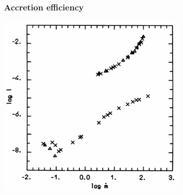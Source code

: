 \documentclass{beamer}
\begin{document}
\begin{frame}
    \frametitle{Accretion efficiency}
    \centering
    \includegraphics[width=0.7\textwidth]{../figures/logl-logm}
\end{frame}
\end{document}
